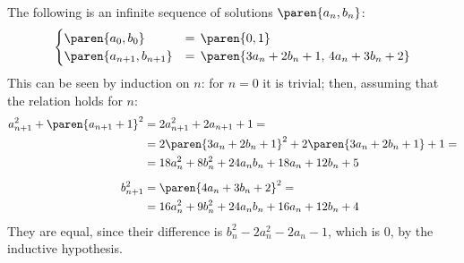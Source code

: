 The following is an infinite sequence of solutions $\paren{a_n, b_n}$:
\begin{equation*}
\begin{cases}
  \paren{a_0,       b_0}       &= \, \paren{0, 1} \\
  \paren{a_{n + 1}, b_{n + 1}} &= \, \paren{3 a_{n} + 2 b_{n} + 1, \, 4 a_{n} + 3 b_{n} + 2}
\end{cases}
\end{equation*}
This can be seen by induction on $n$:
for $n = 0$ it is trivial;
then, assuming that the relation holds for $n$:
\begin{align*}
  a_{n + 1}^2 + \paren{a_{n + 1} + 1}^2
  &= 2 a_{n + 1}^2 + 2 a_{n + 1} + 1 = \\
  &= 2 \paren{3 a_{n} + 2 b_{n} + 1}^2 + 2 \paren{3 a_{n} + 2 b_{n} + 1} + 1 = \\
  &= 18 a_{n}^{2} + 8 b_{n}^{2} + 24 a_{n} b_{n} + 18 a_{n} + 12 b_{n} + 5 \\[1ex]
  b_{n + 1}^2
  &= \paren{4 a_{n} + 3 b_{n} + 2}^2 = \\
  &= 16 a_{n}^{2} + 9 b_{n}^{2} + 24 a_{n} b_{n} + 16 a_{n} + 12 b_{n} + 4
\end{align*}
They are equal, since their difference is $b_{n}^2 - 2 a_{n}^2 - 2 a_{n} - 1$,
which is $0$, by the inductive hypothesis.
